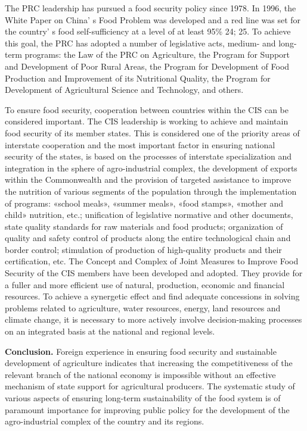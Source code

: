 {The PRC leadership has pursued a food security policy since 1978. In
1996, the White Paper on China' s Food Problem was
developed and a red line was set for the country' s food
self-sufficiency at a level of at least 95\% 24; 25. To achieve this
goal, the PRC has adopted a number of legislative acts, medium- and
long-term programs: the Law of the PRC on Agriculture, the Program for
Support and Development of Poor Rural Areas, the Program for Development
of Food Production and Improvement of its Nutritional Quality, the
Program for Development of Agricultural Science and Technology, and
others.

To ensure food security, cooperation between countries within the CIS
can be considered important. The CIS leadership is working to achieve
and maintain food security of its member states. This is considered one
of the priority areas of interstate cooperation and the most important
factor in ensuring national security of the states, is based on the
processes of interstate specialization and integration in the sphere of
agro-industrial complex, the development of exports within the
Commonwealth and the provision of targeted assistance to improve the
nutrition of various segments of the population through the
implementation of programs: «school meals», «summer meals», «food
stamps», «mother and child» nutrition, etc.; unification of legislative
normative and other documents, state quality standards for raw materials
and food products; organization of quality and safety control of
products along the entire technological chain and border control;
stimulation of production of high-quality products and their
certification, etc. The Concept and Complex of Joint Measures to Improve
Food Security of the CIS members have been developed and adopted. They
provide for a fuller and more efficient use of natural, production,
economic and financial resources. To achieve a synergetic effect and
find adequate concessions in solving problems related to agriculture,
water resources, energy, land resources and climate change, it is
necessary to more actively involve decision-making processes on an
integrated basis at the national and regional levels.

{\bfseries Conclusion.} Foreign experience in ensuring food security and
sustainable development of agriculture indicates that increasing the
competitiveness of the relevant branch of the national economy is
impossible without an effective mechanism of state support for
agricultural producers. The systematic study of various aspects of
ensuring long-term sustainability of the food system is of paramount
importance for improving public policy for the development of the
agro-industrial complex of the country and its regions.

}
